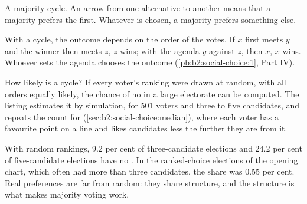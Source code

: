 \begin{omfigure}

{\small A majority cycle. An arrow from one alternative to another means that a majority prefers the
first. Whatever is chosen, a majority prefers something else.}
\end{omfigure}

With a cycle, the outcome depends on the order of the votes. If $x$ first meets $y$ and the winner then
meets $z$, $z$ wins; with the agenda $y$ against $z$, then $x$, $x$ wins. Whoever sets the agenda chooses the
outcome (\cref{pb:b2:social-choice:1}, Part IV).

How likely is a cycle? If every voter's ranking were drawn at random, with all orders equally likely, the
chance of no  in a large electorate can be computed. The listing estimates it by
simulation, for 501 voters and three to five candidates, and repeats the count for  (\cref{sec:b2:social-choice:median}), where each voter has a favourite point on a line and
likes candidates less the further they are from it.

\label{lst:b2:social-choice:random}

\label{out:b2:social-choice:random}

With random rankings, 9.2 per cent of three-candidate elections and 24.2 per cent of five-candidate
elections have no . In the ranked-choice elections of the opening chart, which often had
more than three candidates, the share was 0.55 per cent. Real preferences are far from random: they share
structure, and the structure is what makes majority voting work.

